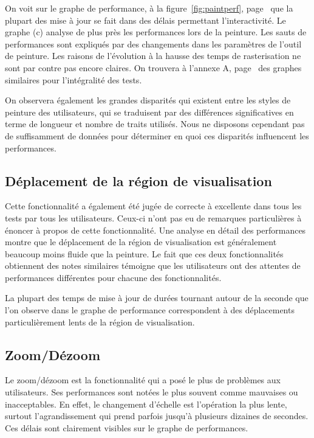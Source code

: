 		On voit sur le graphe de performance, à la figure~\ref{fig:paintperf}, page~\pageref{fig:paintperf} que la plupart des mise à jour
		se fait dans des délais permettant l'interactivité. Le graphe (c) analyse de plus près les performances lors de la peinture. Les sauts
		de performances sont expliqués par des changements dans les paramètres de l'outil de peinture. Les raisons de l'évolution à la hausse
		des temps de rasterisation ne sont par contre pas encore claires. On trouvera à l'annexe A, page~\pageref{annexa} des graphes similaires
		pour l'intégralité des tests. 

		On observera également les grandes disparités qui existent entre les styles de peinture des utilisateurs, qui se traduisent par des
		différences significatives en terme de longueur et nombre de traits utilisés. Nous ne disposons cependant pas de suffisamment de
		données pour déterminer en quoi ces disparités influencent les performances. 

		\subsection{Déplacement de la région de visualisation}
		Cette fonctionnalité a également été jugée de correcte à excellente dans tous les tests par tous les utilisateurs. Ceux-ci n'ont pas
		eu de remarques particulières à énoncer à propos de cette fonctionnalité. Une analyse en détail des performances montre que le déplacement
		de la région de visualisation est généralement beaucoup moins fluide que la peinture. Le fait que ces deux fonctionnalités obtiennent des
		notes similaires témoigne que les utilisateurs ont des attentes de performances différentes pour chacune des fonctionnalités. 

		La plupart des temps de mise à jour de durées tournant autour de la seconde que l'on observe dans le graphe de performance correspondent
		à des déplacements particulièrement lents de la région de visualisation. 
		
		\subsection{Zoom/Dézoom}
		Le zoom/dézoom est la fonctionnalité qui a posé le plus de problèmes aux utilisateurs. Ses performances sont notées le plus souvent comme
		mauvaises ou inacceptables. En effet, le changement d'échelle est l'opération la plus lente, surtout l'agrandissement qui prend parfois
		jusqu'à plusieurs dizaines de secondes. Ces délais sont clairement visibles sur le graphe de performances. 
		

